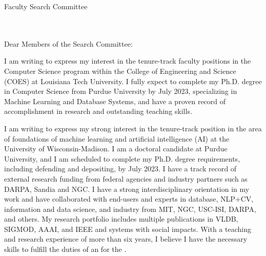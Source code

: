 \documentclass[11pt]{article}
\begin{document}
\thispagestyle{plain}

\pagestyle{empty}

Faculty Search Committee \\
\DepartmentName \\
\InstitutionName \\
\DepartmentAddress

Dear Members of the Search Committee:

I am writing to express my interest in the tenure-track faculty positions in the Computer Science program within the College of Engineering and Science (COES) at Louisiana Tech University. I fully expect to complete my Ph.D. degree in Computer Science from Purdue University by July 2023, specializing in Machine Learning and Database Systems, and have a proven record of accomplishment in research and outstanding teaching skills.

I am writing to express my strong interest in the tenure-track position in the area of foundations of machine learning and artificial intelligence (AI) at the University of Wisconsin-Madison.
I am a doctoral candidate at Purdue University, and I am scheduled to complete my Ph.D. degree requirements, including defending and depositing, by July 2023. I have a track record of external research funding from federal agencies and industry partners such as DARPA, Sandia and NGC. I have a strong interdisciplinary orientation in my work and have collaborated with end-users and experts in database, NLP+CV, information and data science, and industry from MIT, NGC, USC-ISI, DARPA, and others. My research portfolio includes multiple publications in VLDB, SIGMOD, AAAI, and IEEE and systems with social impacts.
%
With a teaching and research experience of more than six years, I believe I have the necessary skills to fulfill the duties of an \PositionName{} for the \InstitutionName{}.
\end{document}
